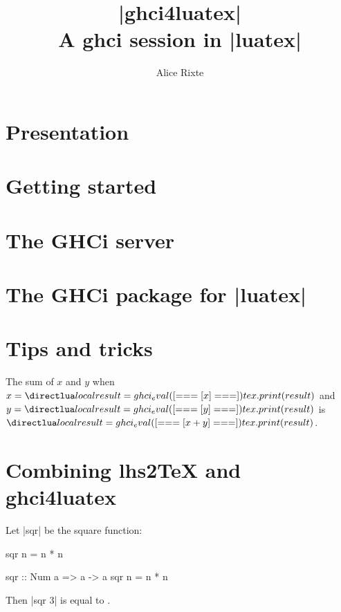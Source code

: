 \documentclass{article}
\title{|ghci4luatex| \\ \vspace{0.4em}
  \large A ghci session in |luatex|}
\author{Alice Rixte}
\begin{document}
\maketitle

\section{Presentation}

\section{Getting started}

\section{The GHCi server}

\section{The GHCi package for |luatex|}

\section{Tips and tricks}


The sum of $x$ and $y$ when $x = \hask{x}$ and $y = \hask{y}$ is $\hask{x + y}$.

\section{Combining lhs2TeX and ghci4luatex}



Let |sqr| be the square function:

\begin{code}
sqr n = n * n
\end{code}

\begin{ghci}
  sqr :: Num a => a -> a
  sqr n = n * n
\end{ghci}

Then  |sqr 3| is equal to .
\end{document}
